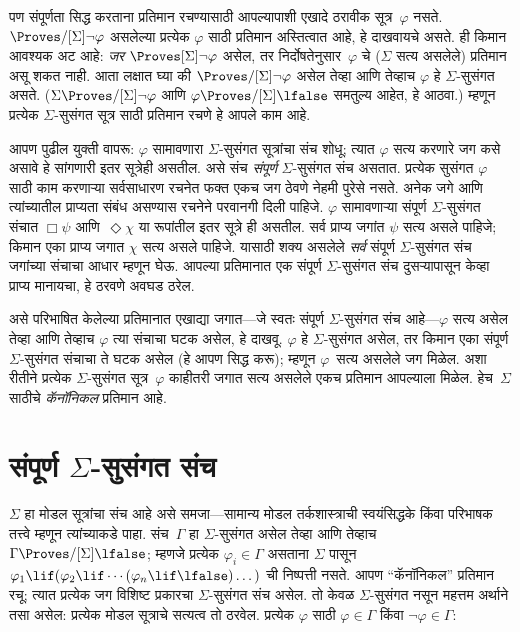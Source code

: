 पण संपूर्णता सिद्ध करताना प्रतिमान रचण्यासाठी
आपल्यापाशी एखादे ठरावीक सूत्र~$\varphi$
नसते. $\Proves/[\Sigma] \lnot \varphi$ असलेल्या
प्रत्येक $\varphi$ साठी प्रतिमान अस्तित्वात आहे,
हे दाखवायचे असते. ही किमान आवश्यक अट आहे:
\emph{जर} $\Proves[\Sigma] \lnot \varphi$ असेल,
तर निर्दोषतेनुसार~$\varphi$ चे
($\Sigma$ सत्य असलेले) प्रतिमान असू शकत नाही.
आता लक्षात घ्या की $\Proves/[\Sigma]
\lnot \varphi$ असेल तेव्हा आणि तेव्हाच $\varphi$ हे
$\Sigma$-सुसंगत असते. ($\Sigma
\Proves/[\Sigma] \lnot \varphi$ आणि
$\varphi \Proves/[\Sigma] \lfalse$ समतुल्य
आहेत, हे आठवा.) म्हणून प्रत्येक
$\Sigma$-सुसंगत सूत्र साठी प्रतिमान
रचणे हे आपले काम आहे.

आपण पुढील युक्ती वापरू: $\varphi$ सामावणारा
$\Sigma$-सुसंगत सूत्रांचा संच शोधू;
त्यात $\varphi$ सत्य करणारे जग कसे असावे
हे सांगणारी इतर सूत्रेही असतील. असे संच
\emph{संपूर्ण} $\Sigma$-सुसंगत संच असतात.
प्रत्येक सुसंगत $\varphi$ साठी काम करणाऱ्या सर्वसाधारण रचनेत
फक्त एकच जग ठेवणे नेहमी पुरेसे नसते. अनेक जगे आणि
त्यांच्यातील प्राप्यता संबंध असण्यास रचनेने परवानगी दिली पाहिजे. $\varphi$ सामावणाऱ्या
संपूर्ण $\Sigma$-सुसंगत संचात
$\Box \psi$ आणि~$\Diamond \chi$ या रूपांतील
इतर सूत्रे ही असतील. सर्व प्राप्य
जगांत $\psi$ सत्य असले पाहिजे; किमान एका
प्राप्य जगात $\chi$ सत्य असले पाहिजे. यासाठी
शक्य असलेले \emph{सर्व} संपूर्ण
$\Sigma$-सुसंगत संच जगांच्या संचाचा
आधार म्हणून घेऊ. आपल्या प्रतिमानात एक
संपूर्ण $\Sigma$-सुसंगत संच दुसऱ्यापासून
केव्हा प्राप्य मानायचा, हे ठरवणे अवघड
ठरेल.

असे परिभाषित केलेल्या प्रतिमानात एखाद्या
जगात---जे स्वतः संपूर्ण $\Sigma$-सुसंगत
संच आहे---$\varphi$ सत्य असेल तेव्हा आणि
तेव्हाच $\varphi$ त्या संचाचा घटक
असेल, हे दाखवू. $\varphi$ हे
$\Sigma$-सुसंगत असेल, तर किमान एका
संपूर्ण $\Sigma$-सुसंगत संचाचा ते
घटक असेल (हे आपण सिद्ध करू);
म्हणून $\varphi$~सत्य असलेले जग मिळेल. अशा
रीतीने प्रत्येक $\Sigma$-सुसंगत
सूत्र~$\varphi$ काहीतरी जगात सत्य असलेले
एकच प्रतिमान आपल्याला मिळेल.
हेच~$\Sigma$ साठीचे \emph{कॅनॉनिकल}
प्रतिमान आहे.













\section{संपूर्ण $\Sigma$-सुसंगत संच}\label{nml:com:ccs:sec}

$\Sigma$ हा मोडल सूत्रांचा संच आहे असे
समजा---सामान्य मोडल तर्कशास्त्राची स्वयंसिद्धके
किंवा परिभाषक तत्त्वे म्हणून त्यांच्याकडे पाहा.
संच~$\Gamma$ हा $\Sigma$-सुसंगत असेल तेव्हा
आणि तेव्हाच $\Gamma \Proves/[\Sigma] \lfalse$;
म्हणजे प्रत्येक $\varphi_i \in \Gamma$ असताना
$\Sigma$ पासून~$\varphi_1 \lif (\varphi_2 \lif \cdots (\varphi_n \lif
\lfalse)\dots)$ ची निष्पत्ती नसते.
आपण ``कॅनॉनिकल'' प्रतिमान रचू; त्यात प्रत्येक
जग विशिष्ट प्रकारचा $\Sigma$-सुसंगत संच
असेल. तो केवळ $\Sigma$-सुसंगत नसून
महत्तम अर्थाने तसा असेल: प्रत्येक मोडल
सूत्राचे सत्यत्व तो ठरवेल.
प्रत्येक $\varphi$ साठी $\varphi
\in \Gamma$ किंवा $\lnot \varphi \in \Gamma$:

